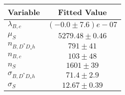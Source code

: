 \begin{tabular}[t]{lc}
\hline
Variable &Fitted Value\\
\hline\hline
$\lambda_{B,c}$&$(-0.0\pm7.6)e-07$\\
\hline
$\mu_S$&$5279.48\pm0.46$\\
\hline
$n_{B, D^* D_s h}$&$791\pm41$\\
\hline
$n_{B,c}$&$103\pm48$\\
\hline
$n_S$&$1601\pm39$\\
\hline
$\sigma_{B, D^* D_s h}$&$71.4\pm2.9$\\
\hline
$\sigma_S$&$12.67\pm0.39$\\
\hline
\end{tabular}